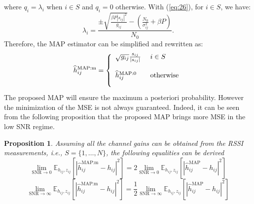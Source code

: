 \documentclass[francais]{gretsi}
\newtheorem{proposition}[theorem]{Proposition}
\begin{document}
where  $q_i=\lambda_i$ when $i \in S$ and $q_i=0$ otherwise.
With (\ref{eq:26}), for $i\in S$, we have:
\begin{equation}
\lambda_i=\frac{\displaystyle{\pm\sqrt{\frac{\beta P |s_{ij}|^2}{g_{ij}}}-(\frac{N_0}{\sigma_{ij}^2}+{\beta P})}}{N_0}.
\end{equation}
Therefore, the MAP estimator can be simplified and rewritten as:
\begin{equation}
\widehat{h}_{ij}^{\text{MAP:m}}=
\left\{
\begin{array}{ll}
\sqrt{g_{ij}} \frac{s_{ij}}{|s_{ij}|} & \hbox{ $i\in S$} \\\\
\widehat{h}_{ij}^{\text{MAP}:0} & \hbox{ otherwise} \\\\
\end{array}
\right.
\end{equation}
The proposed MAP will ensure the maximum a posteriori probability. However the minimization of the MSE is not always guaranteed. Indeed, it can be seen from the following proposition that the proposed MAP brings more MSE in the low SNR regime.
\begin{proposition}
Assuming all the channel gains can be obtained from the RSSI measurements, i.e., $S=\{1,\dots,N\}$, the following equalities can be derived
{\footnotesize \begin{equation}
\underset{\mathrm{SNR}\rightarrow 0}{\lim}\mathbb{E}_{h_{ij},z_{ij}}[|\widehat{h}_{ij}^{\text{MAP:m}}-h_{ij}|^2]=2\underset{\mathrm{SNR}\rightarrow 0}{\lim}\mathbb{E}_{h_{ij},z_{ij}}[|\widehat{h}_{ij}^{\text{MAP}}-h_{ij}|^2]
\end{equation}
\begin{equation}
\underset{\mathrm{SNR}\rightarrow \infty}{\lim}\mathbb{E}_{h_{ij},z_{ij}}[|\widehat{h}_{ij}^{\text{MAP:m}}-h_{ij}|^2]=\frac{1}{2}\underset{\mathrm{SNR}\rightarrow \infty}{\lim}\mathbb{E}_{h_{ij},z_{ij}}[|\widehat{h}_{ij}^{\text{MAP}}-h_{ij}|^2]
\end{equation}}
\end{proposition}

\end{document}
